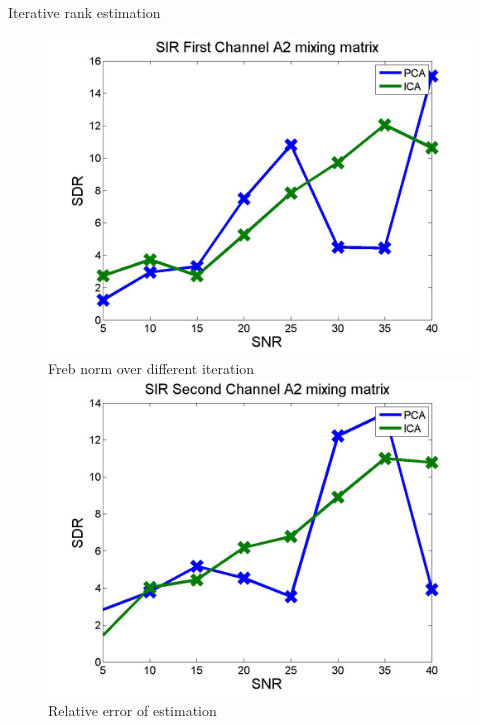 \documentclass[t,12pt,english
\ifx\beamermode\undefined\else,\beamermode\fi
]{beamer}
\begin{document}
\begin{frame}{Iterative rank estimation}

\begin{figure}[!htbp]
%
\centering
\includegraphics[width=1\textwidth]{7.jpg}\\
\tiny{Freb norm over different iteration}\label{a13}
\endminipage\hfill
{}%
\centering
\includegraphics[width=1\textwidth]{8.jpg}\\
\tiny{Relative error of estimation}\label{a14}
\endminipage\hfill
\end{figure}


\end{frame}
\end{document}
